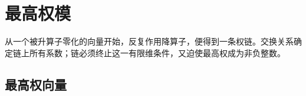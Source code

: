 
\section{最高权模}
\label{b5:sec:1402}


%
%

从一个被升算子零化的向量开始，反复作用降算子，便得到一条权链。交换关系确定链上所有系数；链必须终止这一有限维条件，又迫使最高权成为非负整数。

\subsection{最高权向量}
\label{b5:subsec:1402:01}

